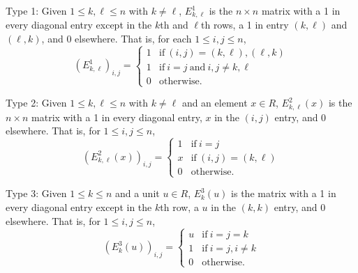 \begin{enumerate*}
\item[] Type 1: Given $1 \leq k,\ell \leq n$ with $k \neq \ell$, $E^1_{k,\ell}$ is the $n \times n$ matrix with a 1 in every diagonal entry except in the $k$th and $\ell$th rows, a 1 in entry $(k,\ell)$ and $(\ell,k)$, and 0 elsewhere. That is, for each $1 \leq i,j \leq n$, \[(E^1_{k,\ell})_{i,j} = \left\{ \begin{array}{ll} 1 & \mathrm{if}\ (i,j) = (k,\ell), (\ell,k) \\ 1 & \mathrm{if}\ i=j\ \mathrm{and}\ i,j \neq k,\ell \\ 0 & \mathrm{otherwise.} \end{array}\right. \]

\item[] Type 2: Given $1 \leq k,\ell \leq n$ with $k \neq \ell$ and an element $x \in R$, $E^2_{k,\ell}(x)$ is the $n \times n$ matrix with a 1 in every diagonal entry, $x$ in the $(i,j)$ entry, and 0 elsewhere. That is, for $1 \leq i,j \leq n$, \[(E^2_{k,\ell}(x))_{i,j} = \left\{ \begin{array}{ll} 1 & \mathrm{if}\ i = j \\ x & \mathrm{if}\ (i,j) = (k,\ell) \\ 0 & \mathrm{otherwise.} \end{array}\right.\]

\item[] Type 3: Given $1 \leq k \leq n$ and a unit $u \in R$, $E^3_k(u)$ is the matrix with a 1 in every diagonal entry except in the $k$th row, a $u$ in the $(k,k)$ entry, and 0 elsewhere. That is, for $1 \leq i,j \leq n$, \[(E^3_k(u))_{i,j} = \left\{\begin{array}{ll} u & \mathrm{if}\ i=j=k \\ 1 & \mathrm{if}\ i=j, i \neq k \\ 0 & \mathrm{otherwise.} \end{array}\right.\]
\end{enumerate*}

